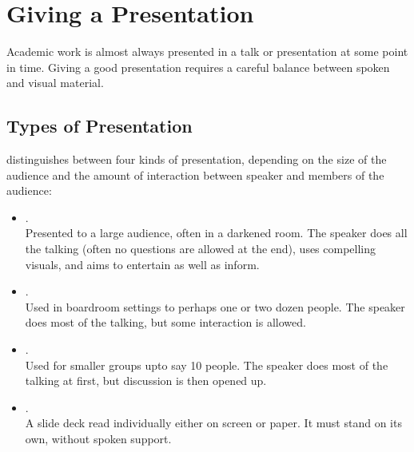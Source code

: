 %
%
% 
% 
% 


\chapter{Giving a Presentation}

\label{chap:Presentation}


Academic work is almost always presented in a talk or presentation at
some point in time. Giving a good presentation requires a careful
balance between spoken and visual material.


\section{Types of Presentation}

\textcite{SpeakingPowerPoint} distinguishes between four kinds of
presentation, depending on the size of the audience and the amount of
interaction between speaker and members of the audience:
\begin{itemize}
\item {}. \\
   Presented to a large audience,
  often in a darkened room. The speaker does all the talking (often no
  questions are allowed at the end), uses compelling visuals, and aims
  to entertain as well as inform.

\item {}. \\
   Used in boardroom settings to
  perhaps one or two dozen people. The speaker does most of the
  talking, but some interaction is allowed.

\item {}. \\
  Used for smaller groups upto
  say 10 people. The speaker does most of the talking at first, but
  discussion is then opened up.

\item {}. \\
  A slide deck read individually
  either on screen or paper. It must stand on its own, without spoken
  support.
\end{itemize}





